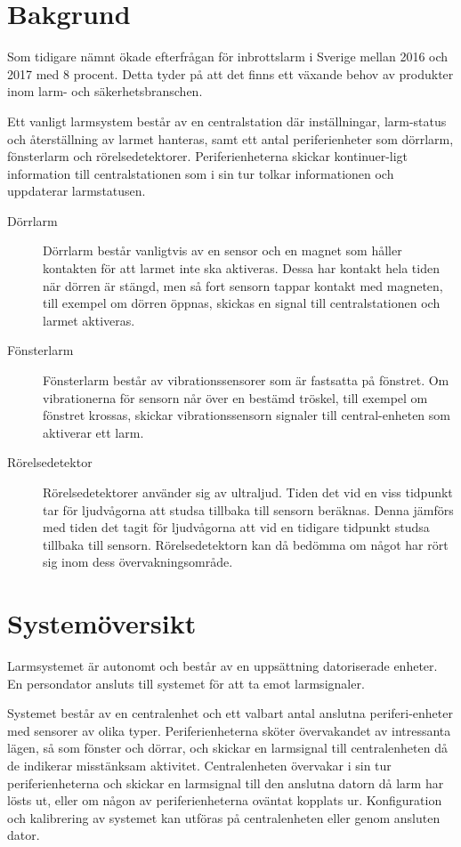 \documentclass[a4paper]{article}
\begin{document}
\section{Bakgrund}
\label{sec:bakgrund}

Som tidigare nämnt ökade efterfrågan för inbrottslarm i Sverige mellan 2016 och 2017 med 8 procent. Detta tyder på att det finns ett växande behov av produkter inom larm- och säkerhetsbranschen.

Ett vanligt larmsystem består av en centralstation där inställningar, larm-status och återställning av larmet hanteras, samt ett antal periferienheter som dörrlarm, fönsterlarm och rörelsedetektorer. Periferienheterna skickar kontinuer-ligt information till centralstationen som i sin tur tolkar informationen och uppdaterar larmstatusen.

\begin{description}
\item [Dörrlarm] Dörrlarm består vanligtvis av en sensor och en magnet som håller kontakten för att larmet inte ska aktiveras. Dessa har kontakt hela tiden när dörren är stängd, men så fort sensorn tappar kontakt med magneten, till exempel om dörren öppnas, skickas en signal till centralstationen och larmet aktiveras.
\item [Fönsterlarm] Fönsterlarm består av vibrationssensorer som är fastsatta på fönstret. Om vibrationerna för sensorn når över en bestämd tröskel, till exempel om fönstret krossas, skickar vibrationssensorn signaler till central-enheten som aktiverar ett larm.
\item [Rörelsedetektor] Rörelsedetektorer använder sig av ultraljud. Tiden det vid en viss tidpunkt tar för ljudvågorna att studsa tillbaka till sensorn beräknas. Denna jämförs med tiden det tagit för ljudvågorna att vid en tidigare tidpunkt studsa tillbaka till sensorn. Rörelsedetektorn kan då bedömma om något har rört sig inom dess övervakningsområde.
\end{description}

\section{Systemöversikt}
\label{sec:systemöversikt}

Larmsystemet är autonomt och består av en uppsättning datoriserade enheter. En persondator ansluts till systemet för att ta emot larmsignaler.

Systemet består av en centralenhet och ett valbart antal anslutna periferi-enheter med sensorer av olika typer. Periferienheterna sköter övervakandet av intressanta lägen, så som fönster och dörrar, och skickar en larmsignal till centralenheten då de indikerar misstänksam aktivitet. Centralenheten övervakar i sin tur periferienheterna och skickar en larmsignal till den anslutna datorn då larm har lösts ut, eller om någon av periferienheterna oväntat kopplats ur. Konfiguration och kalibrering av systemet kan utföras på centralenheten eller genom ansluten dator.
\end{document}
